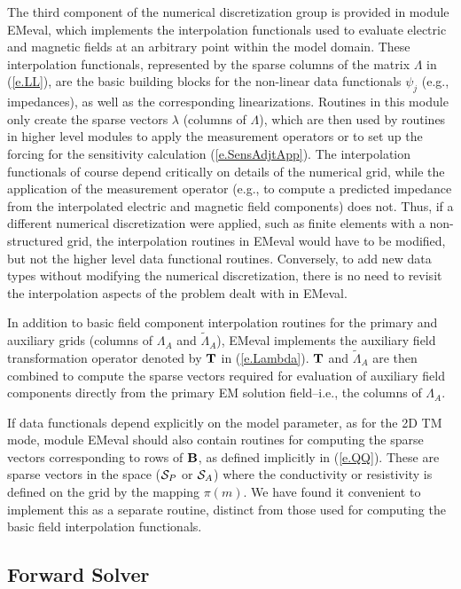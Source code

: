 The third component of the numerical discretization group
is provided in module EMeval, which implements the 
interpolation functionals used
to evaluate electric and magnetic fields at an arbitrary point within
the model domain.
These interpolation functionals,
represented by the sparse columns of the matrix $\Lambda$
in (\ref{e.LL}), are the
basic building blocks for the non-linear data functionals
$\psi_j$ (e.g., impedances), as well as the corresponding linearizations.
Routines in this module only create the sparse vectors $\lambda$
(columns of $\Lambda$),
which are then used by routines in higher level modules
to apply the measurement operators or to set up the forcing for
the sensitivity calculation (\ref{e.SensAdjtApp}).
The interpolation functionals of course depend critically on
details of the numerical grid, while the application
of the measurement operator (e.g., to compute a predicted
impedance from the interpolated electric
and magnetic field components) does not.
Thus, if a different numerical
discretization were applied, such as
finite elements with a non-structured grid, 
the interpolation routines in EMeval would have to be modified, but
not the higher level data functional routines.
Conversely, to add new data types without modifying the numerical
discretization, there is no need to revisit
the interpolation aspects of the problem dealt with in EMeval.

In addition to basic field component interpolation
routines for the primary and auxiliary grids
(columns of $\Lambda_A$ and $\tilde\Lambda_A$),
EMeval implements the auxiliary field transformation
operator denoted by ${\bf T}$ in (\ref{e.Lambda}).
${\bf T}$ and $\tilde\Lambda_A$ are then combined
to compute the sparse vectors required for
evaluation of auxiliary field components directly from the primary
EM solution field--i.e., the columns of $\Lambda_A$. 

If data functionals depend explicitly on the model parameter,
as for the 2D TM mode,
module EMeval should also contain routines for computing the sparse
vectors corresponding to rows of ${\bf B}$, as defined implicitly in
(\ref{e.QQ}).  These are sparse vectors in the space 
(${\cal S}_P$ or ${\cal S}_A$) where the conductivity or resistivity
is defined on the grid by the mapping $\pi(m)$.  We have found it
convenient to implement this as a separate routine, distinct
from those used for computing the basic field interpolation functionals.

\subsection{Forward Solver}

